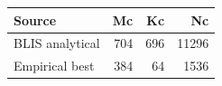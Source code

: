 \begin{tabular}{lrrr}
\hline
Source & Mc & Kc & Nc \\
\hline
BLIS analytical & 704 & 696 & 11296 \\
Empirical best & 384 & 64 & 1536 \\
\hline
\end{tabular}
